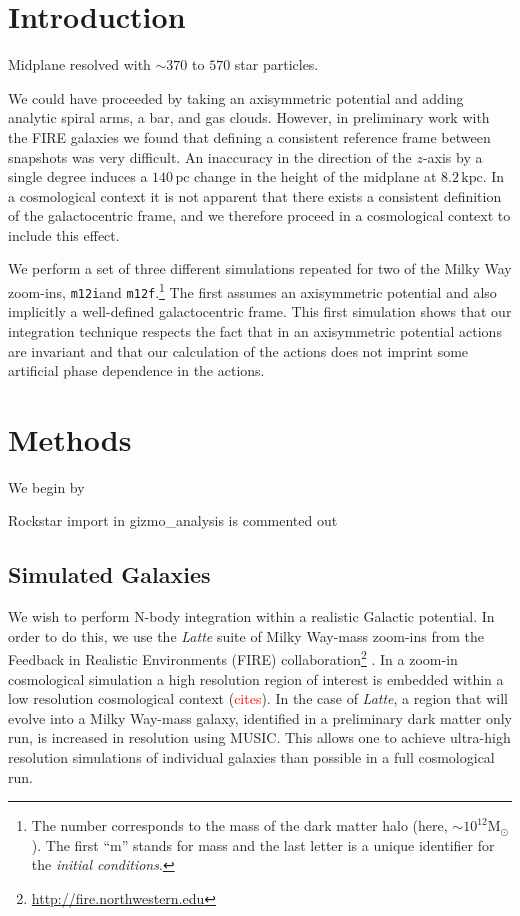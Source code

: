 \documentclass[twocolumn]{aastex62}
\newcommand{\Gus}[1]{\textcolor{red}{#1}}
\newcommand{\Msun}{\text{M}_\odot}
\newcommand{\pc}{\text{pc}}
\newcommand{\kpc}{\text{kpc}}
\newcommand{\mi}{\texttt{m12i}}
\newcommand{\mf}{\texttt{m12f}}
\begin{document}

\section{Introduction} \label{sec:intro}


Midplane resolved with $\sim 370$ to $570$ star particles.

We could have proceeded by taking an axisymmetric potential and adding
analytic spiral arms, a bar, and gas clouds. However, in preliminary work
with the FIRE galaxies we found that defining a consistent reference frame
between snapshots was very difficult. An inaccuracy in the direction of the
$z$-axis by a single degree induces a $140\,\pc$ change in the height of the
midplane at $8.2\,\kpc$. In a cosmological context it is not apparent that
there exists a consistent definition of the galactocentric frame, and we
therefore proceed in a cosmological context to include this effect.

We perform a set of three different simulations repeated for two of the Milky
Way zoom-ins, \mi and \mf.\footnote{The number corresponds to the mass of the
dark matter halo (here, $\sim 10^{12} \Msun$). The first ``m'' stands for
mass and the last letter is a unique identifier for the {\em initial
conditions}.} The first assumes an axisymmetric potential and also implicitly
a well-defined galactocentric frame. This first simulation shows that our
integration technique respects the fact that in an axisymmetric potential
actions are invariant and that our calculation of the actions does not
imprint some artificial phase dependence in the actions.


\section{Methods} \label{sec:methods}
We begin by 

Rockstar import in gizmo\_analysis is commented out

\subsection{Simulated Galaxies} \label{ssec:fire}
We wish to perform N-body integration within a realistic Galactic potential.
In order to do this, we use the {\em Latte} suite of Milky Way-mass zoom-ins
from the Feedback in Realistic Environments (FIRE)
collaboration\footnote{\url{http://fire.northwestern.edu}}
\citep{2016ApJ...827L..23W,2018MNRAS.480..800H}. In a zoom-in cosmological
simulation a high resolution region of interest is embedded within a low
resolution cosmological context (\Gus{cites}). In the case of {\em Latte}, a
region that will evolve into a Milky Way-mass galaxy, identified in a
preliminary dark matter only run, is increased in resolution using MUSIC.
This allows one to achieve ultra-high resolution simulations of individual
galaxies than possible in a full cosmological run. 
\end{document}
